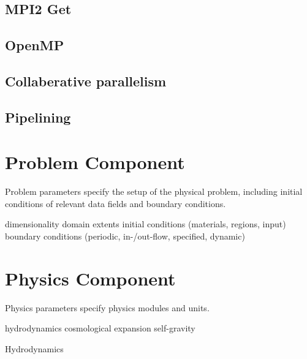 \subsection{MPI2 Get}

\subsection{OpenMP}

\subsection{Collaberative parallelism}

\subsection{Pipelining}




\section{Problem Component}

Problem parameters specify the setup of the physical problem,
including initial conditions of relevant data fields and boundary
conditions.

  dimensionality
  domain extents
  initial conditions (materials, regions, input)
 boundary conditions (periodic, in-/out-flow, specified, dynamic)

\section{Physics Component}

Physics parameters specify physics modules and units.

 hydrodynamics
  cosmological expansion
 self-gravity

Hydrodynamics


